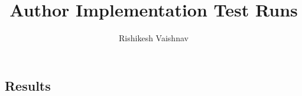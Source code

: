 \documentclass[a4paper]{article}
\title{Author Implementation Test Runs}
\author{Rishikesh Vaishnav}
\begin{document}
\maketitle
\subsection*{Results}
\begin{centering}
\scalebox{0.6}{}\\
\end{centering}
\end{document}
